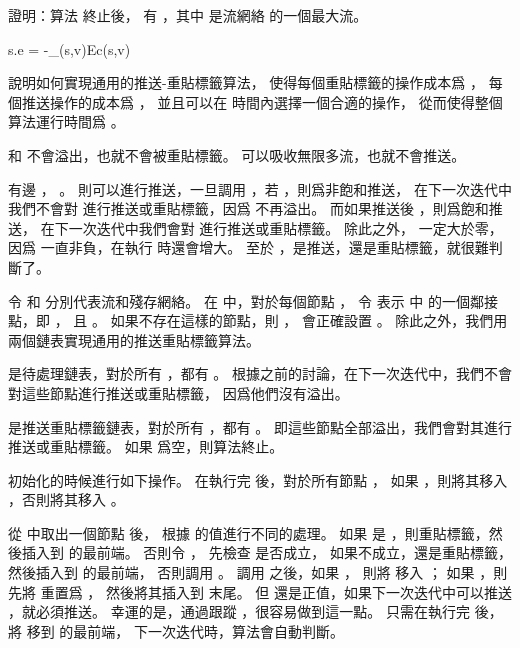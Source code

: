 \startsection[
  title={Push-relabel algorithms},
]

\startEXERCISE
證明：算法  終止後，
有 ，其中  是流網絡  的一個最大流。
\stopEXERCISE

\startANSWER
\startformula
s.e = -\sum_{(s,v)\in E}c(s,v)
\stopformula
\stopANSWER

\startEXERCISE
說明如何實現通用的推送-重貼標籤算法，
使得每個重貼標籤的操作成本爲 ，
每個推送操作的成本爲 ，
並且可以在  時間內選擇一個合適的操作，
從而使得整個算法運行時間爲 。
\stopEXERCISE

\startANSWER
{} 和  不會溢出，也就不會被重貼標籤。
  可以吸收無限多流，也就不會推送。

有邊 ， 。
則可以進行推送，一旦調用 ，若 ，則爲非飽和推送，
在下一次迭代中我們不會對  進行推送或重貼標籤，因爲  不再溢出。
而如果推送後 ，則爲飽和推送，
在下一次迭代中我們會對  進行推送或重貼標籤。
除此之外，  一定大於零，
因爲  一直非負，在執行  時還會增大。
至於 ，是推送，還是重貼標籤，就很難判斷了。

令  和  分別代表流和殘存網絡。
在  中，對於每個節點 ，
令  表示  中  的一個鄰接點，即 ，
且 。
如果不存在這樣的節點，則 ，
  會正確設置 。
除此之外，我們用兩個鏈表實現通用的推送重貼標籤算法。

 是待處理鏈表，對於所有 ，都有 。
根據之前的討論，在下一次迭代中，我們不會對這些節點進行推送或重貼標籤，
因爲他們沒有溢出。

 是推送重貼標籤鏈表，對於所有 ，都有 。
即這些節點全部溢出，我們會對其進行推送或重貼標籤。
如果  爲空，則算法終止。

初始化的時候進行如下操作。
在執行完  後，對於所有節點 ，
如果 ，則將其移入 ，否則將其移入 。

從  中取出一個節點  後，
根據  的值進行不同的處理。
如果  是 ，則重貼標籤，然後插入到  的最前端。
否則令 ，
先檢查  是否成立，
如果不成立，還是重貼標籤，然後插入到  的最前端，
否則調用 。
調用  之後，如果 ，
則將  移入 ；
如果 ，則先將  重置爲 ，
然後將其插入到  末尾。
但  還是正值，如果下一次迭代中可以推送 ，就必須推送。
幸運的是，通過跟蹤 ，很容易做到這一點。
只需在執行完  後，將  移到  的最前端，
下一次迭代時，算法會自動判斷。

